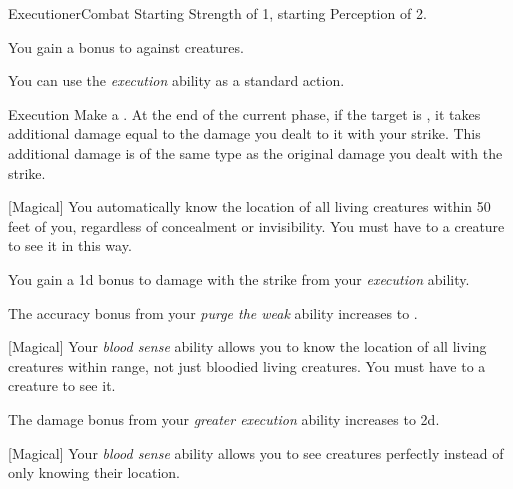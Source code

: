     \begin{feat}{Executioner}{Combat}
        \featpres Starting Strength of 1, starting Perception of 2.

         You gain a  bonus to  against  creatures.

         You can use the \textit{execution} ability as a standard action.
        \begin{apability}{Execution}
            Make a .
            At the end of the current phase, if the target is , it takes additional damage equal to the damage you dealt to it with your strike.
            This additional damage is of the same type as the original damage you dealt with the strike.
        \end{apability}

        [Magical] You automatically know the location of all  living creatures within 50 feet of you, regardless of concealment or invisibility.
        You must have  to a creature to see it in this way.

         You gain a \plus1d bonus to damage with the strike from your \textit{execution} ability.

         The accuracy bonus from your \textit{purge the weak} ability increases to .

        [Magical] Your \textit{blood sense} ability allows you to know the location of all living creatures within range, not just bloodied living creatures.
        You must have  to a creature to see it.

         The damage bonus from your \textit{greater execution} ability increases to \plus2d.

        [Magical] Your \textit{blood sense} ability allows you to see creatures perfectly instead of only knowing their location.
    \end{feat}

